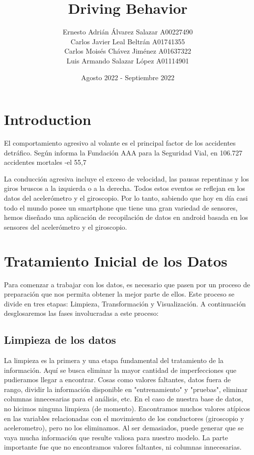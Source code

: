 \documentclass{article}
\title{Driving Behavior}
\author{
Ernesto Adrián Álvarez Salazar  A00227490\\
Carlos Javier Leal Beltrán  A01741355\\
Carlos Moisés Chávez Jiménez  A01637322\\
Luis Armando Salazar López  A01114901\\
}
\date{Agosto 2022 - Septiembre 2022}
\begin{document}
\maketitle

\section{Introduction}
El comportamiento agresivo al volante es el principal factor de los accidentes detráfico. Según informa la Fundación AAA para la Seguridad Vial, en 106.727 accidentes mortales -el 55,7%

La conducción agresiva incluye el exceso de velocidad, las pausas repentinas y los giros bruscos a la izquierda o a la derecha. Todos estos eventos se reflejan en los datos del acelerómetro y el giroscopio. Por lo tanto, sabiendo que hoy en día casi todo el mundo posee un smartphone que tiene una gran variedad de sensores, hemos diseñado una aplicación de recopilación de datos en android basada en los sensores del acelerómetro y el giroscopio.


\section{Tratamiento Inicial de los Datos}

Para comenzar a trabajar con los datos, es necesario que pasen por un proceso de preparación que nos permita obtener la mejor parte de ellos. Este proceso se divide en tres etapas: Limpieza, Transformación y Visualización. A continuación desglosaremos las fases involucradas a este proceso:

    \subsection{Limpieza de los datos}

        La limpieza es la primera y una etapa fundamental del tratamiento de la información. Aquí se busca eliminar la mayor cantidad de imperfecciones que pudieramos llegar a encontrar. Cosas como valores faltantes, datos fuera de rango, dividir la información disponible en "entrenamiento" y "pruebas", eliminar columnas innecesarias para el análisis, etc.
        En el caso de nuestra base de datos, no hicimos ninguna limpieza (de momento). Encontramos muchos valores atípicos en las variables relacionadas con el movimiento de los conductores (giroscopio y acelerometro), pero no los eliminamos. Al ser demasiados, puede generar que se vaya mucha información que resulte valiosa para nuestro modelo. La parte importante fue que no encontramos valores faltantes, ni columnas innecesarias. \\
\end{document}
